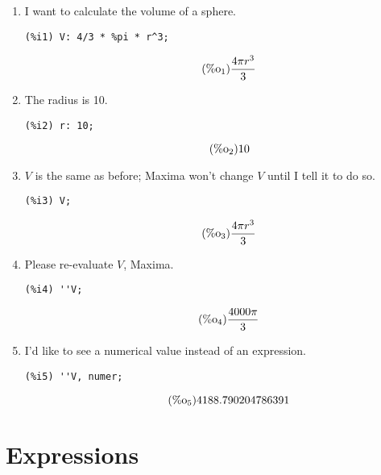 \documentclass[12pt,leqno]{article}
\begin{document}
\begin{enumerate}

\item I want to calculate the volume of a sphere.
\begin{verbatim}
(%i1) V: 4/3 * %pi * r^3;
\end{verbatim}
\begin{equation}
\tag{$\mathop{\mathrm{\%o}}_{1}$}\frac{4 \pi {r}^{3}}{3}
\label{eq:doc-group1-code1-1}
\end{equation}

\item The radius is 10.
\begin{verbatim}
(%i2) r: 10;
\end{verbatim}
\begin{equation}
\tag{$\mathop{\mathrm{\%o}}_{2}$}10
\label{eq:doc-group1-code2-1}
\end{equation}

\item $V$ is the same as before; Maxima won't change $V$ until I tell it to do so.
\begin{verbatim}
(%i3) V;
\end{verbatim}
\begin{equation}
\tag{$\mathop{\mathrm{\%o}}_{3}$}\frac{4 \pi {r}^{3}}{3}
\label{eq:doc-group1-code3-1}
\end{equation}

\item Please re-evaluate $V$, Maxima.
\begin{verbatim}
(%i4) ''V;
\end{verbatim}
\begin{equation}
\tag{$\mathop{\mathrm{\%o}}_{4}$}\frac{4000 \pi}{3}
\label{eq:doc-group1-code4-1}
\end{equation}

\item I'd like to see a numerical value instead of an expression.
\begin{verbatim}
(%i5) ''V, numer;
\end{verbatim}
\begin{equation}
\tag{$\mathop{\mathrm{\%o}}_{5}$}4188.790204786391
\label{eq:doc-group1-code5-1}
\end{equation}

\end{enumerate}

\section{Expressions}
\end{document}
